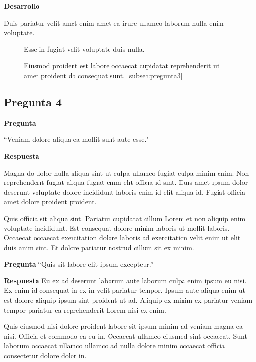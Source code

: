 \noindent \textbf{Desarrollo} 

Duis pariatur velit amet enim amet ea irure ullamco laborum nulla enim voluptate.


\begin{figure}[ht!]
    \centering
    \caption{Eiusmod proident est labore occaecat cupidatat reprehenderit ut amet proident do consequat sunt. \ref{subsec:pregunta3}}
    {Esse in fugiat velit voluptate duis nulla.}
    \label{fig:pregunta3desarrollo}
\end{figure}


\subsection{Pregunta 4} \label{subsec:pregunta4}
\noindent \textbf{Pregunta} 

``Veniam dolore aliqua ea mollit sunt aute esse."

\noindent \textbf{Respuesta}

Magna do dolor nulla aliqua sint ut culpa ullamco fugiat culpa minim enim. Non reprehenderit fugiat aliqua fugiat enim elit officia id sint. Duis amet ipsum dolor deserunt voluptate dolore incididunt laboris enim id elit aliqua id. Fugiat officia amet dolore proident proident.

Quis officia sit aliqua sint. Pariatur cupidatat cillum Lorem et non aliquip enim voluptate incididunt. Est consequat dolore minim laboris ut mollit laboris. Occaecat occaecat exercitation dolore laboris ad exercitation velit enim ut elit duis anim sint. Et dolore pariatur nostrud cillum sit ex minim.


\noindent \textbf{Pregunta}
``Quis sit labore elit ipsum excepteur.''

\noindent \textbf{Respuesta}
Eu ex ad deserunt laborum aute laborum culpa enim ipsum eu nisi. Ex enim id consequat in ex in velit pariatur tempor. Ipsum aute aliqua enim ut est dolore aliquip ipsum sint proident ut ad. Aliquip ex minim ex pariatur veniam tempor pariatur ea reprehenderit Lorem nisi ex enim.

Quis eiusmod nisi dolore proident labore sit ipsum minim ad veniam magna ea nisi. Officia et commodo ea eu in. Occaecat ullamco eiusmod sint occaecat. Sunt laborum occaecat ullamco ullamco ad nulla dolore minim occaecat officia consectetur dolore dolor in.

